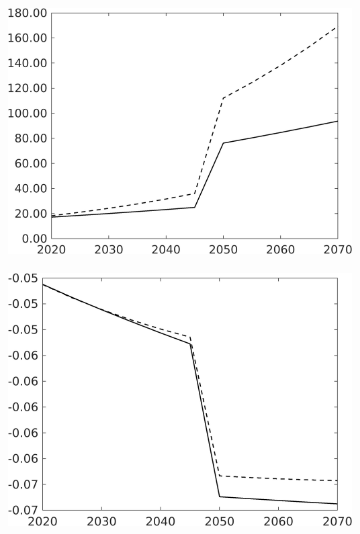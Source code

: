 \begin{figure}[h!!!]
\begin{subfigure}[]{0.32\textwidth}
	\end{subfigure}
	\begin{subfigure}[]{0.32\textwidth}
		\includegraphics[width=1\textwidth]{../../codding_model/own_basedOnFried/optimalPol_010922_revision/figures/all_13Sept22_Tplus30/GFF_PercentageLFDyn_Target_regime4_knspil1_spillover0_noskill0_sep0_xgrowth0_PV1_etaa0.79_lgd0.png}
	\end{subfigure}
	\begin{subfigure}[]{0.32\textwidth}
		\includegraphics[width=1\textwidth]{../../codding_model/own_basedOnFried/optimalPol_010922_revision/figures/all_13Sept22_Tplus30/EY_PercentageLFDyn_Target_regime4_knspil1_spillover0_noskill0_sep0_xgrowth0_PV1_etaa0.79_lgd0.png}
	\end{subfigure}
\end{figure} 
